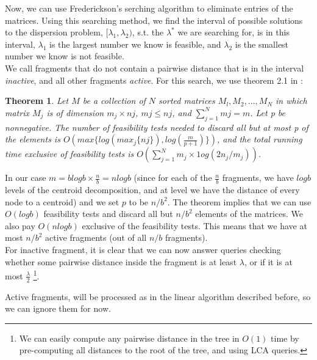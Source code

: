 \documentclass[11pt,a4paper]{article}
\newtheorem{theorem}{Theorem}[section]
\theoremstyle{definition}
\theoremstyle{remark}
\begin{document}
Now, we can use Frederickson's serching algorithm to eliminate entries of the matrices. Using this searching method, we find the interval of possible solutions to the dispersion problem, $[\lambda_1,\lambda_2)$, s.t. the $\lambda^*$ we are searching for, is in this interval, $\lambda_1$ is the largest number we know is feasible, and $\lambda_2$ is the smallest number we know is not feasible.\\
We call fragments that do not contain a pairwise distance that is in the interval \textit{inactive}, and all other fragments \textit{active}.
For this search, we use theorem 2.1 in \cite{Frederickson1991}:
\begin{theorem}\label{Frederickson's theorem}
Let $M$ be a collection of $N$ sorted matrices ${M_l, M_2, . . . , M_N}$ in which matrix $M_j$ is of dimension $m_j \times nj$, $mj \leq nj$, and $\sum_{j=1}^{N} mj = m$.
Let p be nonnegative. The number of feasibility tests needed to discard all but at most p of the elements is $O(max \lbrace log (max_j \lbrace nj \rbrace), log(\frac{m}{p+1}) \rbrace )$, and the total running time exclusive of feasibility tests is $O(\sum_{j=1}^{N} m_j \times 1og(2n_j/m_j))$.
\end{theorem}
In our case $m=blogb \times \frac{n}{b} = nlogb$ (since for each of the $\frac{n}{b}$ fragments, we have $logb$ levels of the centroid decomposition, and at level we have the distance of every node to a centroid) and we set $p$ to be $n/b^2$. The theorem implies that we can use $O(logb)$ feasibility tests and discard all but $n/b^2$ elements of the matrices. We also pay $O(nlogb)$ exclusive of the feasibility tests. This means that we have at most $n/b^2$ active fragments (out of all $n/b$ fragments). \\
For inactive fragment, it is clear that we can now answer queries checking whether some pairwise distance inside the fragment is at least $\lambda$, or if it is at most $\frac{\lambda}{2}$ \footnote{We can easily compute any pairwise distance in the tree in $O(1)$ time by pre-computing all distances to the root of the tree, and using LCA queries.}.

Active fragments, will be processed as in the linear algorithm described before, so we can ignore them for now.
\end{document}
